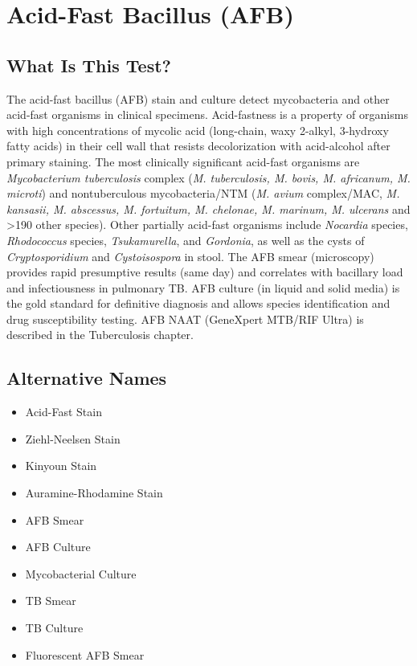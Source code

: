 \chapter{Acid-Fast Bacillus (AFB)}

\section*{What Is This Test?}
The acid-fast bacillus (AFB) stain and culture detect mycobacteria and other acid-fast organisms in clinical specimens. Acid-fastness is a property of organisms with high concentrations of mycolic acid (long-chain, waxy 2-alkyl, 3-hydroxy fatty acids) in their cell wall that resists decolorization with acid-alcohol after primary staining. The most clinically significant acid-fast organisms are \textit{Mycobacterium tuberculosis} complex (\textit{M. tuberculosis, M. bovis, M. africanum, M. microti}) and nontuberculous mycobacteria/NTM (\textit{M. avium} complex/MAC, \textit{M. kansasii, M. abscessus, M. fortuitum, M. chelonae, M. marinum, M. ulcerans} and >190 other species). Other partially acid-fast organisms include \textit{Nocardia} species, \textit{Rhodococcus} species, \textit{Tsukamurella}, and \textit{Gordonia}, as well as the cysts of \textit{Cryptosporidium} and \textit{Cystoisospora} in stool. The AFB smear (microscopy) provides rapid presumptive results (same day) and correlates with bacillary load and infectiousness in pulmonary TB. AFB culture (in liquid and solid media) is the gold standard for definitive diagnosis and allows species identification and drug susceptibility testing. AFB NAAT (GeneXpert MTB/RIF Ultra) is described in the Tuberculosis chapter.

\section*{Alternative Names}
\begin{itemize}
  \item Acid-Fast Stain
  \item Ziehl-Neelsen Stain
  \item Kinyoun Stain
  \item Auramine-Rhodamine Stain
  \item AFB Smear
  \item AFB Culture
  \item Mycobacterial Culture
  \item TB Smear
  \item TB Culture
  \item Fluorescent AFB Smear
\end{itemize}
